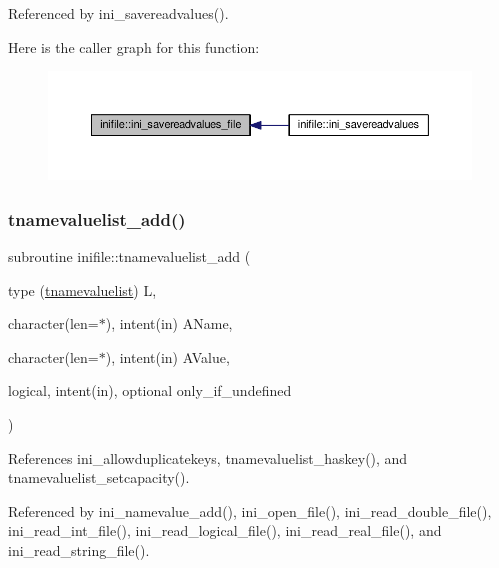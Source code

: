 Referenced by ini\+\_\+savereadvalues().

Here is the caller graph for this function\+:
\nopagebreak
\begin{figure}[H]
\begin{center}
\leavevmode
\includegraphics[width=350pt]{namespaceinifile_a2e53433c13f03131abc980a06455e53b_icgraph}
\end{center}
\end{figure}
\mbox{\label{namespaceinifile_a71aeaf793bb8c4435154a6e8e52bdfaf}} 
\subsubsection{\texorpdfstring{tnamevaluelist\+\_\+add()}{tnamevaluelist\_add()}}
{\footnotesize\ttfamily subroutine inifile\+::tnamevaluelist\+\_\+add (\begin{DoxyParamCaption}\item[{type (\mbox{\hyperlink{structinifile_1_1tnamevaluelist}{tnamevaluelist}})}]{L,  }\item[{character(len=$\ast$), intent(in)}]{A\+Name,  }\item[{character(len=$\ast$), intent(in)}]{A\+Value,  }\item[{logical, intent(in), optional}]{only\+\_\+if\+\_\+undefined }\end{DoxyParamCaption})}



References ini\+\_\+allowduplicatekeys, tnamevaluelist\+\_\+haskey(), and tnamevaluelist\+\_\+setcapacity().



Referenced by ini\+\_\+namevalue\+\_\+add(), ini\+\_\+open\+\_\+file(), ini\+\_\+read\+\_\+double\+\_\+file(), ini\+\_\+read\+\_\+int\+\_\+file(), ini\+\_\+read\+\_\+logical\+\_\+file(), ini\+\_\+read\+\_\+real\+\_\+file(), and ini\+\_\+read\+\_\+string\+\_\+file().

